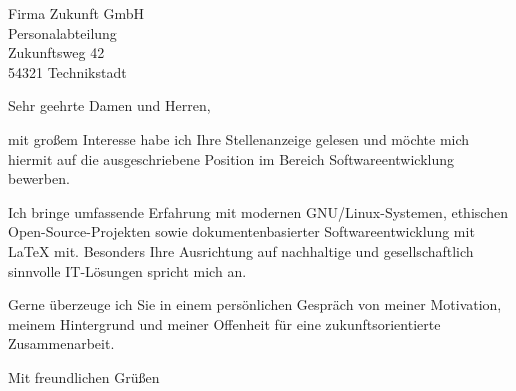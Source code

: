 \documentclass[12pt,a4paper,parskip=half]{scrlttr2}
\begin{document}
\begin{letter}{
  Firma Zukunft GmbH\\
  Personalabteilung\\
  Zukunftsweg 42\\
  54321 Technikstadt
}

\opening{Sehr geehrte Damen und Herren,}

mit großem Interesse habe ich Ihre Stellenanzeige gelesen und möchte mich hiermit auf die ausgeschriebene Position im Bereich Softwareentwicklung bewerben.

Ich bringe umfassende Erfahrung mit modernen GNU/Linux-Systemen, ethischen Open-Source-Projekten sowie dokumentenbasierter Softwareentwicklung mit LaTeX mit. Besonders Ihre Ausrichtung auf nachhaltige und gesellschaftlich sinnvolle IT-Lösungen spricht mich an.

Gerne überzeuge ich Sie in einem persönlichen Gespräch von meiner Motivation, meinem Hintergrund und meiner Offenheit für eine zukunftsorientierte Zusammenarbeit.

\closing{Mit freundlichen Grüßen}

\end{letter}
\end{document}
